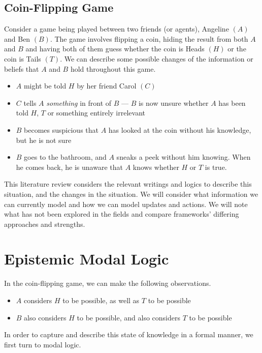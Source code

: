 \documentclass[12pt, a4paper, titlepage]{scrartcl}
\begin{document}
\subsection{Coin-Flipping Game}\label{intro_coinFlipping}
Consider a game being played between two friends (or agents), Angeline $(A)$
and Ben $(B)$.
The game involves flipping a coin, hiding the result from both $A$ and $B$ and
having both of them guess whether the coin is Heads $(H)$ or the coin is Tails
$(T)$.
We can describe some possible changes of the information or beliefs that $A$ and
$B$ hold throughout this game.
\begin{itemize}
	\item $A$ might be told $H$ by her friend Carol $(C)$
	\item $C$ tells $A$ {\em something} in front of $B$ --- $B$ is now unsure
	whether $A$ has been told $H$, $T$ or something entirely irrelevant 
	\item $B$ becomes suspicious that $A$ has looked at the coin without his
	knowledge, but he is not sure
	\item $B$ goes to the bathroom, and $A$ sneaks a peek without him knowing.
	When he comes back, he is unaware that $A$ knows whether $H$ or $T$ is true.
\end{itemize}
This literature review considers the relevant writings and logics to describe
this situation, and the changes in the situation.
We will consider what information we can currently model and how we can model
updates and actions.
We will note what has not been explored in the fields and compare frameworks'
differing approaches and strengths.

\section{Epistemic Modal Logic}\label{epistemic}
In the coin-flipping game, we can make the following observations.
\begin{itemize}
	\item $A$ considers $H$ to be possible, as well as $T$ to be possible
	\item $B$ also considers $H$ to be possible, and also considers $T$ to be possible
\end{itemize}
In order to capture and describe this state of knowledge in a formal manner, we
first turn to modal logic.
\end{document}
